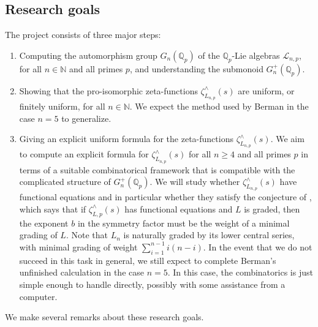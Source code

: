 \documentclass[12pt]{article}
\begin{document}
\subsection{Research goals}
The project consists of three major steps:
\begin{enumerate}
\item
Computing the automorphism group $G_{n}(\mathbb{Q}_{p})$ of the $\mathbb{Q}_p$-Lie algebras $\mathcal{L}_{n,p}$, for all $n\in\mathbb{N}$ and all primes $p$, and understanding the submonoid $G_{n}^{+}(\mathbb{Q}_{p})$.
\item
Showing that the pro-isomorphic zeta-functions $\zeta_{L_{n,p}}^{\wedge}(s)$ are uniform, or finitely uniform, for all $n\in\mathbb{N}$. We expect the method used by Berman in the case $n=5$ to generalize.
\item
Giving an explicit uniform formula for the zeta-functions $\zeta_{L_{n,p}}^{\wedge}(s)$.
We aim to compute an explicit formula for $\zeta_{L_{n,p}}^{\wedge}(s)$ for all $n \geq 4$ and all primes $p$ in terms of a suitable combinatorical framework that is compatible with the complicated structure of $G_{n}^{+}(\mathbb{Q}_p)$. We will study whether $\zeta_{L_{n,p}}^{\wedge}(s)$ have functional equations and in particular whether they satisfy the conjecture of \cite{BermanKlopschOnn}, which says that if $\zeta_{L,p}^{\wedge}(s)$ has functional equations and $L$ is graded, then the exponent $b$ in the symmetry factor must be the weight of a minimal grading of $L$. Note that $L_{n}$ is naturally graded by its lower central series, with minimal grading of weight $\sum_{i=1}^{n-1}{i(n-i)}$. In the event that we do not succeed in this task in general, we still expect to complete Berman's unfinished calculation in the case $n=5$. In this case, the combinatorics is just simple enough to handle directly, possibly with some assistance from a computer.
\end{enumerate}
We make several remarks about these research goals.
\end{document}
